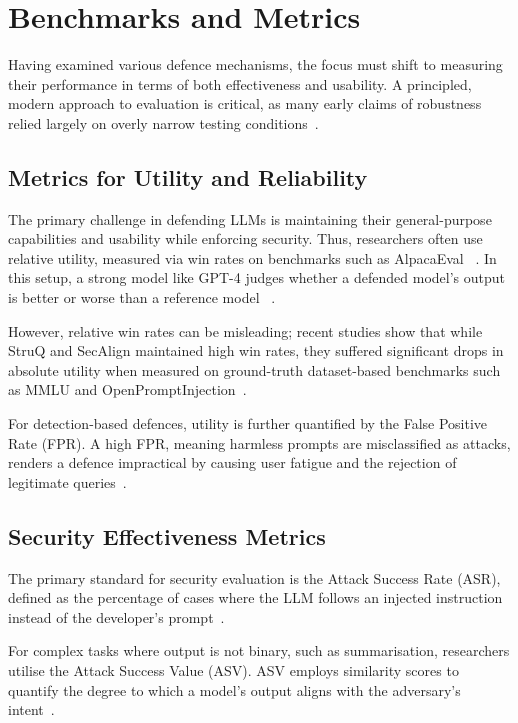 \section{Benchmarks and Metrics}
\label{sec:benchmarks}

Having examined various defence mechanisms, the focus must shift to measuring
their performance in terms of both effectiveness and usability. A principled,
modern approach to evaluation is critical, as many early claims of robustness
relied largely on overly narrow testing conditions~\parencite{jia2025critical}.

\subsection{Metrics for Utility and Reliability}

The primary challenge in defending LLMs is maintaining their general-purpose
capabilities and usability while enforcing security. Thus, researchers often use
relative utility, measured via win rates on benchmarks such as AlpacaEval
~\parencite{jia2025critical}. In this setup, a strong model like GPT-4 judges
whether a defended model's output is better or worse than a reference model
~\parencite{chen2025struq}.

However, relative win rates can be misleading; recent studies show that while
StruQ and SecAlign maintained high win rates, they suffered significant drops
in absolute utility when measured on ground-truth dataset-based benchmarks such
as MMLU and OpenPromptInjection~\parencite{jia2025critical}.

For detection-based defences, utility is further quantified by the False
Positive Rate (FPR). A high FPR, meaning harmless prompts are misclassified as
attacks, renders a defence impractical by causing user fatigue and the rejection
of legitimate queries~\parencite{jia2025critical}.

\subsection{Security Effectiveness Metrics}

The primary standard for security evaluation is the Attack Success Rate (ASR),
defined as the percentage of cases where the LLM follows an injected instruction
instead of the developer's prompt~\parencite{zou2023universal}.

For complex tasks where output is not binary, such as summarisation,
researchers utilise the Attack Success Value (ASV). ASV employs similarity
scores to quantify the degree to which a model's output aligns with the
adversary's intent~\parencite{jia2025critical}.

